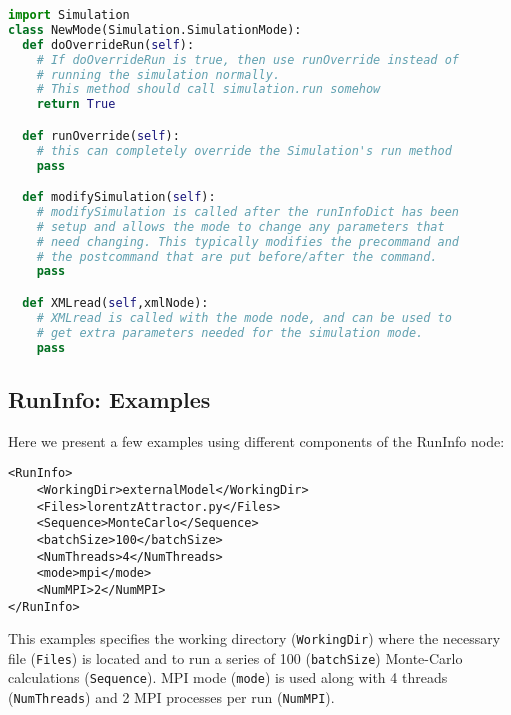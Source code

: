 \begin{lstlisting}[language=python]
import Simulation
class NewMode(Simulation.SimulationMode):
  def doOverrideRun(self):
    # If doOverrideRun is true, then use runOverride instead of
    # running the simulation normally.
    # This method should call simulation.run somehow
    return True

  def runOverride(self):
    # this can completely override the Simulation's run method
    pass

  def modifySimulation(self):
    # modifySimulation is called after the runInfoDict has been
    # setup and allows the mode to change any parameters that
    # need changing. This typically modifies the precommand and
    # the postcommand that are put before/after the command.
    pass

  def XMLread(self,xmlNode):
    # XMLread is called with the mode node, and can be used to
    # get extra parameters needed for the simulation mode.
    pass
\end{lstlisting}
\subsection{RunInfo: Examples}
\label{subsec:runinfoexamples}
Here we present a few examples using different components of the RunInfo node:
\begin{lstlisting}[style=XML]
<RunInfo>
    <WorkingDir>externalModel</WorkingDir>
    <Files>lorentzAttractor.py</Files>
    <Sequence>MonteCarlo</Sequence>
    <batchSize>100</batchSize>
    <NumThreads>4</NumThreads>
    <mode>mpi</mode>
    <NumMPI>2</NumMPI>
</RunInfo>
\end{lstlisting}
This examples specifies the working directory (\texttt{WorkingDir}) where the
necessary file (\texttt{Files}) is located and to run a series of 100
(\texttt{batchSize}) Monte-Carlo calculations (\texttt{Sequence}).
%
MPI mode (\texttt{mode}) is used along with 4 threads (\texttt{NumThreads}) and
2 MPI processes per run (\texttt{NumMPI}).

